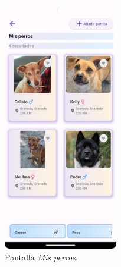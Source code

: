 \documentclass[a4paper, 12pt]{article}
\begin{document}
\begin{figure}[H]
	\begin{center}
		{\includegraphics[width=5cm]{app/MyDogs.png}\par}
		\caption{Pantalla \textit{Mis perros}.}
	\end{center}  
\end{figure}
\end{document}

